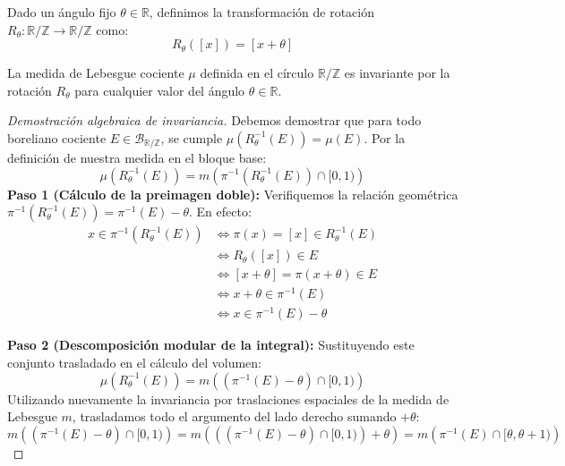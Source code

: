 \begin{definicion}
	Dado un ángulo fijo $\theta \in \mathbb{R}$, definimos la transformación de rotación $R_\theta: \mathbb{R}/\mathbb{Z} \to \mathbb{R}/\mathbb{Z}$ como:
	$$ R_\theta([x]) = [x + \theta] $$
\end{definicion}

\begin{teorema}
	La medida de Lebesgue cociente $\mu$ definida en el círculo $\mathbb{R}/\mathbb{Z}$ es invariante por la rotación $R_\theta$ para cualquier valor del ángulo $\theta \in \mathbb{R}$.
\end{teorema}

\begin{proof}[Demostración algebraica de invariancia]
	Debemos demostrar que para todo boreliano cociente $E \in \mathcal{B}_{\mathbb{R}/\mathbb{Z}}$, se cumple $\mu(R_\theta^{-1}(E)) = \mu(E)$. Por la definición de nuestra medida en el bloque base:
	$$ \mu(R_\theta^{-1}(E)) = m\left( \pi^{-1}(R_\theta^{-1}(E)) \cap [0, 1) \right) $$
	\textbf{Paso 1 (Cálculo de la preimagen doble):} Verifiquemos la relación geométrica $\pi^{-1}(R_\theta^{-1}(E)) = \pi^{-1}(E) - \theta$. En efecto:
	\begin{align*}
		x \in \pi^{-1}(R_\theta^{-1}(E)) &\iff \pi(x) = [x] \in R_\theta^{-1}(E) \\
		&\iff R_\theta([x]) \in E \\
		&\iff [x + \theta] = \pi(x + \theta) \in E \\
		&\iff x + \theta \in \pi^{-1}(E) \\
		&\iff x \in \pi^{-1}(E) - \theta
	\end{align*}
	
	\textbf{Paso 2 (Descomposición modular de la integral):} Sustituyendo este conjunto trasladado en el cálculo del volumen:
	$$ \mu(R_\theta^{-1}(E)) = m\left( (\pi^{-1}(E) - \theta) \cap [0, 1) \right) $$
	Utilizando nuevamente la invariancia por traslaciones espaciales de la medida de Lebesgue $m$, trasladamos todo el argumento del lado derecho sumando $+\theta$:
	$$ m\left( (\pi^{-1}(E) - \theta) \cap [0, 1) \right) = m\left( \left( (\pi^{-1}(E) - \theta) \cap [0, 1) \right) + \theta \right) = m\left( \pi^{-1}(E) \cap [\theta, \theta + 1) \right) $$
	

\end{proof}
